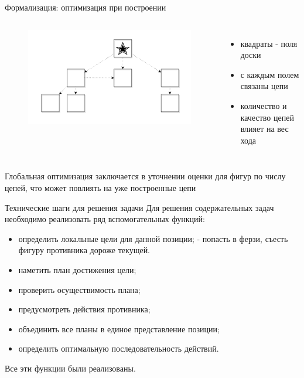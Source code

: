 \begin{frame}{Формализация: оптимизация при построении}
\begin{columns}
\begin{figure}
\includegraphics[scale=0.2]{./pictures/piece.png}
\end{figure}
\begin{itemize}
\item квадраты - поля доски
\item с каждым полем связаны цепи
\item количество и качество цепей влияет на вес хода
\end{itemize}
\end{columns}
Глобальная оптимизация заключается в уточнении оценки для фигур по числу цепей, что может повлиять на уже построенные цепи
\end{frame}

\begin{frame}{Технические шаги для решения задачи}
Для решения содержательных задач необходимо реализовать ряд вспомогательных функций:
\begin{itemize}
\item определить локальные цели для данной позиции; - попасть в ферзи, съесть фигуру противника дороже текущей.
\item наметить план достижения цели;
\item проверить осуществимость плана;
\item предусмотреть действия противника;
\item объединить все планы в единое представление позиции;
\item определить оптимальную последовательность действий.
\end{itemize}
Все эти функции были реализованы.
\end{frame}
